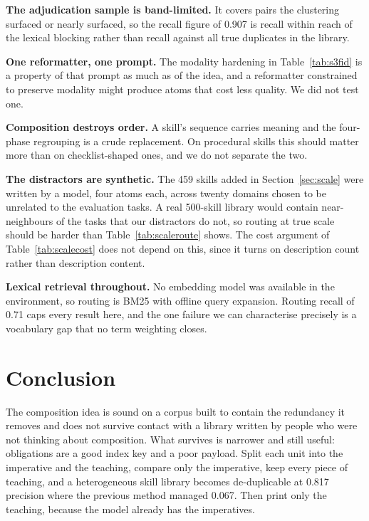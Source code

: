 \documentclass[11pt]{article}
\begin{document}
\textbf{The adjudication sample is band-limited.} It covers pairs the clustering surfaced or nearly
surfaced, so the recall figure of 0.907 is recall within reach of the lexical blocking rather than
recall against all true duplicates in the library.

\textbf{One reformatter, one prompt.} The modality hardening in Table~\ref{tab:s3fid} is a property
of that prompt as much as of the idea, and a reformatter constrained to preserve modality might
produce atoms that cost less quality. We did not test one.

\textbf{Composition destroys order.} A skill's sequence carries meaning and the four-phase regrouping
is a crude replacement. On procedural skills this should matter more than on checklist-shaped ones,
and we do not separate the two.

\textbf{The distractors are synthetic.} The 459 skills added in Section~\ref{sec:scale} were
written by a model, four atoms each, across twenty domains chosen to be unrelated to the evaluation
tasks. A real 500-skill library would contain near-neighbours of the tasks that our distractors do
not, so routing at true scale should be harder than Table~\ref{tab:scaleroute} shows. The
cost argument of Table~\ref{tab:scalecost} does not depend on this, since it turns on description
count rather than description content.

\textbf{Lexical retrieval throughout.} No embedding model was available in the environment, so
routing is BM25 with offline query expansion. Routing recall of 0.71 caps every result here, and the
one failure we can characterise precisely is a vocabulary gap that no term weighting closes.

\section{Conclusion}

The composition idea is sound on a corpus built to contain the redundancy it removes and does not
survive contact with a library written by people who were not thinking about composition. What
survives is narrower and still useful: obligations are a good index key and a poor payload. Split
each unit into the imperative and the teaching, compare only the imperative, keep every piece of
teaching, and a heterogeneous skill library becomes de-duplicable at 0.817 precision where the
previous method managed 0.067. Then print only the teaching, because the model already has the
imperatives.
\end{document}
